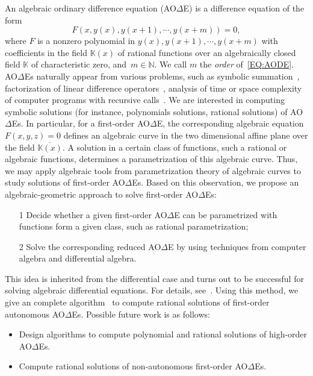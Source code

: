 \documentclass[10pt,a4paper]{article}
\newcommand{\bN}{ {\mathbb  N}}
\newcommand{\bK}{ {\mathbb  K}}
\newcommand{\red}{\color{red}}
\newcommand{\AODE}{{AO{$\Delta$}E}}
\newcommand{\AODEs}{{AO{$\Delta$}Es}}
\begin{document}
An algebraic ordinary difference equation (\AODE) is a difference equation of the form
\begin{equation} \label{EQ:AODE}
F(x, y(x), y(x + 1), \cdots, y(x + m))=0,
\end{equation}
where $F$ is a nonzero polynomial in $y(x), y(x + 1), \cdots, y(x + m)$ with coefficients in the field $\bK(x)$ of rational functions over an algebraically closed field $\bK$ 
of characteristic zero, and~$m \in \bN$. We call $m$ the \emph{order} of~\eqref{EQ:AODE}. 
{\AODE}s naturally appear from various problems, such as symbolic summation~\cite{PWZbook1996, KoutschanThesis}, 
factorization of linear difference operators~\cite{BronsteinPetkovsek1996}, 
analysis of time or space complexity of computer programs with recursive calls~\cite{Eekelen2018}. 
We are interested in computing symbolic solutions (for instance, polynomials solutions, rational solutions) of {\AODE}s.
In particular, for a first-order {\AODE}, the corresponding algebraic equation $F(x, y, z) = 0$ defines an algebraic curve in the two dimensional affine plane 
over the field $\overline{\mathbb{K}(x)}$. A solution in a certain class of
functions, such a rational or algebraic functions, determines a parametrization of this algebraic curve. 
Thus, we may apply algebraic tools from parametrization theory of algebraic curves to study solutions of first-order {\AODE}s. 
Based on this observation, we propose an algebraic-geometric approach to solve first-order {\AODE}s: 
\begin{itemize}
 \item [1] Decide whether a given first-order {\AODE} can be parametrized with functions form a given class, 
such as rational parametrization;
 \item [2] Solve the corresponding reduced {\AODE} by using techniques from computer algebra 
and differential algebra.
\end{itemize}
This idea is inherited from the differential case and turns out to be successful for solving algebraic 
differential equations. For details, see~\cite{Winkler2019}. 
Using this method, we give an complete algorithm~\cite{VoZhang2019} to compute rational solutions of first-order autonomous {\AODE}s. 
Possible future work is as follows: 

\begin{itemize}
\item  Design algorithms to compute polynomial and rational solutions of high-order \AODEs.
\item Compute rational solutions of non-autonomous first-order \AODEs. 
\end{itemize}	
\end{document}
